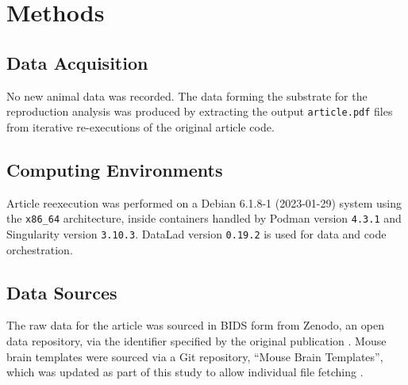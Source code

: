 \section{Methods}


\subsection{Data Acquisition}

No new animal data was recorded.
The data forming the substrate for the reproduction analysis was produced by extracting the output \texttt{article.pdf} files from iterative re-executions of the original article code.

\subsection{Computing Environments}
Article reexecution was performed on a Debian 6.1.8-1 (2023-01-29) system using the \texttt{x86\_64} architecture, inside containers handled by Podman version \texttt{4.3.1} and Singularity version \texttt{3.10.3}.
DataLad version \texttt{0.19.2} is used for data and code orchestration.


\subsection{Data Sources}
The raw data for the article was sourced in BIDS form from Zenodo, an open data repository, via the identifier specified by the original publication \cite{opfvta_bidsdata}.
Mouse brain templates were sourced via a Git repository, “Mouse Brain Templates”, which was updated as part of this study to allow individual file fetching \cite{mbt10}.



